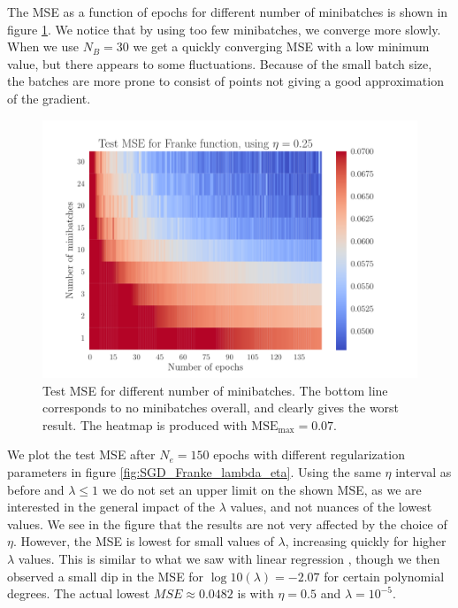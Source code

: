 \documentclass[12pt]{extarticle}
\begin{document}
The MSE as a function of epochs for different number of minibatches is shown in figure \ref{fig:SGD_Franke_epochs_minibatches}. We notice that by using too few minibatches, we converge more slowly. When we use $N_B=30$ we get a quickly converging MSE with a low minimum value, but there appears to some fluctuations. Because of the small batch size, the batches are more prone to consist of points not giving a good approximation of the gradient.

\begin{figure}[h!]
	\includegraphics[width=0.9\linewidth]{SGD_Franke/reg_Franke__epochs_minibatches__Test_MSE__440533.pdf}
	\caption{Test MSE for different number of minibatches. The bottom line corresponds to no minibatches overall, and clearly gives the worst result. The heatmap is produced with $\mathrm{MSE}_\mathrm{max}=0.07$.}
	\label{fig:SGD_Franke_epochs_minibatches}
\end{figure}

We plot the test MSE after $N_e=150$ epochs with different regularization parameters in figure \ref{fig:SGD_Franke_lambda_eta}. Using the same $\eta$ interval as before and $\lambda\leq1$ we do not set an upper limit on the shown MSE, as we are interested in the general impact of the $\lambda$ values, and not nuances of the lowest values. We see in the figure that the results are not very affected by the choice of $\eta$. However, the MSE is lowest for small values of $\lambda$, increasing quickly for higher $\lambda$ values. This is similar to what we saw with linear regression \cite{project1}, though we then observed a small dip in the MSE for $\log10(\lambda)=-2.07$ for certain polynomial degrees. The actual lowest $MSE \approx 0.0482$ is with $\eta = 0.5$ and $\lambda = 10^{-5}$.
\end{document}

